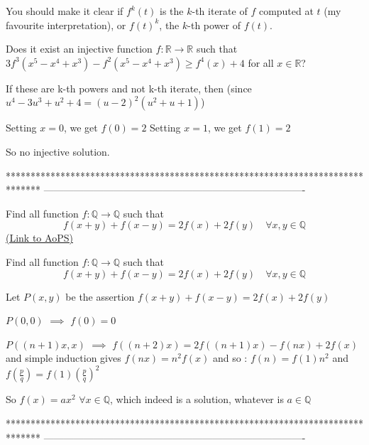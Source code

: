 \begin{solution}
	You should make it clear if $f^k(t)$ is the $k$-th iterate of $f$ computed at $t$ (my favourite interpretation), or $f(t)^k$, the $k$-th power of $f(t)$.
\end{solution}



\begin{solution}
	\begin{tcolorbox}Does it exist an injective function $f: \mathbb{R}\to\mathbb{R}$ such that $3f^3(x^5-x^4+x^3) - f^2(x^5-x^4+x^3) \ge f^4(x)+4$ for all $x \in \mathbb{R}$?\end{tcolorbox}
If these are k-th powers and not k-th iterate, then (since $u^4 - 3u^3 + u^2 + 4 = (u-2)^2(u^2+u+1)$)

Setting $x=0$, we get $f(0)=2$
Setting $x=1$, we get $f(1)=2$

So no injective solution.
\end{solution}
*******************************************************************************
-------------------------------------------------------------------------------

\begin{problem}
	Find all function $f:\mathbb Q\to\mathbb Q$ such that
\[f(x+y)+f(x-y)=2f(x)+2f(y) \quad\forall x,y\in\mathbb Q\]
	\flushright \href{https://artofproblemsolving.com/community/c6h566422}{(Link to AoPS)}
\end{problem}



\begin{solution}
	\begin{tcolorbox}Find all function $f:\mathbb Q\to\mathbb Q$ such that
\[f(x+y)+f(x-y)=2f(x)+2f(y) \quad\forall x,y\in\mathbb Q\]\end{tcolorbox}
Let $P(x,y)$ be the assertion $f(x+y)+f(x-y)=2f(x)+2f(y)$

$P(0,0)$ $\implies$ $f(0)=0$

$P((n+1)x,x)$ $\implies$ $f((n+2)x)=2f((n+1)x)-f(nx)+2f(x)$ and simple induction gives $f(nx)=n^2f(x)$ and so :
$f(n)=f(1)n^2$ and $f(\frac pq)=f(1)\left(\frac pq\right)^2$

So $\boxed{f(x)=ax^2}$ $\forall x\in \mathbb Q$, which indeed is a solution, whatever is $a\in\mathbb Q$
\end{solution}
*******************************************************************************
-------------------------------------------------------------------------------

